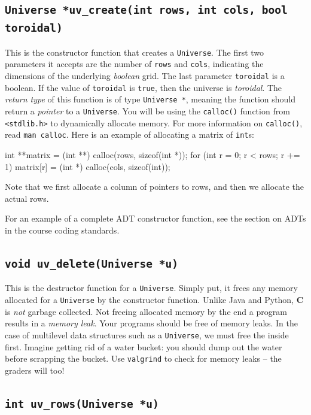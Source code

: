 \documentclass[11pt]{article}
\begin{document}
\subsection{\texttt{Universe *uv\_create(int rows, int cols, bool toroidal)}}

This is the constructor function that creates a \texttt{Universe}. The first two
parameters it accepts are the number of \texttt{rows} and \texttt{cols}, indicating the
dimensions of the underlying \emph{boolean} grid. The last parameter 
\texttt{toroidal} is a boolean. If the value of \texttt{toroidal} is
\texttt{true}, then the universe is \emph{toroidal}. The \emph{return type} of
this function is of type \texttt{Universe *}, meaning the function should return a
\emph{pointer} to a \texttt{Universe}. You will be using the \texttt{calloc()}
function from \texttt{<stdlib.h>} to dynamically allocate memory. 
For more information on \texttt{calloc()}, read \texttt{man calloc}.
Here is an example of allocating a matrix of \texttt{int}s:

\begin{codelisting}{}
int **matrix = (int **) calloc(rows, sizeof(int *));
for (int r = 0; r < rows; r += 1) {
    matrix[r] = (int *) calloc(cols, sizeof(int));
}
\end{codelisting}

Note that we first allocate a column of pointers  to rows, and then we allocate the actual rows.

For an example of a complete ADT constructor function, see the section on ADTs
in the course coding standards.


\subsection{\texttt{void uv\_delete(Universe *u)}}

This is the destructor function for a \texttt{Universe}. Simply put, it frees
any memory allocated for a \texttt{Universe} by the constructor function. Unlike
Java and Python, \textbf{C} is \emph{not} garbage collected. Not freeing
allocated memory by the end a program results in a \emph{memory leak}. Your
programs should be free of memory leaks. In the case of multilevel data
structures such as a \texttt{Universe}, we must free the inside first. Imagine
getting rid of a water bucket: you should dump out the water before scrapping
the bucket. Use \texttt{valgrind} to check for memory leaks -- the graders will too!


\subsection{\texttt{int uv\_rows(Universe *u)}}
\end{document}
